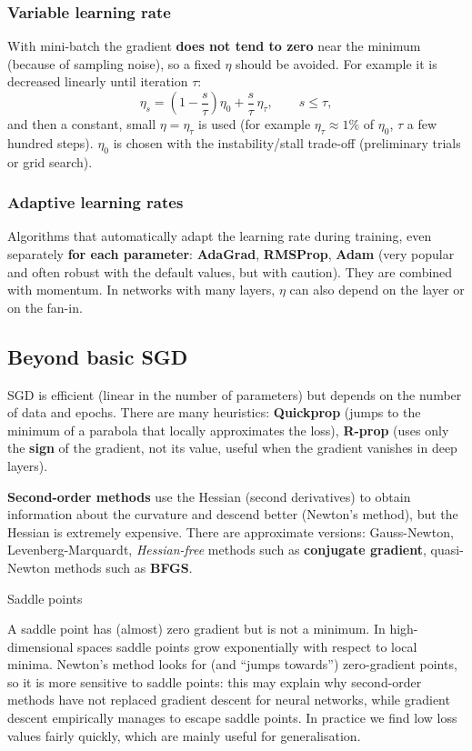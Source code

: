 \subsubsection{Variable learning rate}\label{learning-rate-variabile}

With mini-batch the gradient \textbf{does not tend to zero} near the
minimum (because of sampling noise), so a fixed \(\eta\) should be
avoided. For example it is decreased linearly until iteration
\(\tau\): \[
\eta_s = \left(1 - \frac{s}{\tau}\right)\eta_0 + \frac{s}{\tau}\,\eta_\tau, \qquad s \le \tau,
\] and then a constant, small \(\eta = \eta_\tau\) is used (for example
\(\eta_\tau \approx 1\%\) of \(\eta_0\), \(\tau\) a few hundred
steps). \(\eta_0\) is chosen with the instability/stall trade-off
(preliminary trials or grid search).

\subsubsection{Adaptive learning rates}\label{learning-rate-adattivi}

Algorithms that automatically adapt the learning rate during training,
even separately \textbf{for each parameter}: \textbf{AdaGrad},
\textbf{RMSProp}, \textbf{Adam} (very popular and often robust with the
default values, but with caution). They are combined with momentum. In
networks with many layers, \(\eta\) can also depend on the layer or on
the fan-in.

\subsection{Beyond basic SGD}\label{oltre-lo-sgd-di-base}

SGD is efficient (linear in the number of parameters) but depends on
the number of data and epochs. There are many heuristics:
\textbf{Quickprop} (jumps to the minimum of a parabola that locally
approximates the loss), \textbf{R-prop} (uses only the \textbf{sign} of
the gradient, not its value, useful when the gradient vanishes in deep
layers).

\textbf{Second-order methods} use the Hessian (second derivatives) to
obtain information about the curvature and descend better (Newton's
method), but the Hessian is extremely expensive. There are approximate
versions: Gauss-Newton, Levenberg-Marquardt, \emph{Hessian-free} methods
such as \textbf{conjugate gradient}, quasi-Newton methods such as
\textbf{BFGS}.

\begin{boxnote}{Saddle points}

A saddle point has (almost) zero gradient but is not a minimum. In
high-dimensional spaces saddle points grow exponentially with respect
to local minima. Newton's method looks for (and ``jumps towards'')
zero-gradient points, so it is more sensitive to saddle points: this
may explain why second-order methods have not replaced gradient descent
for neural networks, while gradient descent empirically manages to
escape saddle points. In practice we find low loss values fairly
quickly, which are mainly useful for generalisation.

\end{boxnote}

